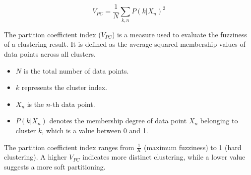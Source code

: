 \documentclass[12pt,letterpaper]{article}
\begin{document}
\begin{itemize}
    \[
    V_{PC} = \frac{1}{N} \sum_{k,n} P(k|X_n)^2
    \]

    \noindent The partition coefficient index (\(V_{PC}\)) is a measure used to evaluate the fuzziness of a clustering result. It is defined as the average squared membership values of data points across all clusters. 

    \begin{itemize}
        \item \( N \) is the total number of data points.
        \item \( k \) represents the cluster index.
        \item \( X_n \) is the \( n \)-th data point.
        \item \( P(k|X_n) \) denotes the membership degree of data point \( X_n \) belonging to cluster \( k \), which is a value between 0 and 1.
    \end{itemize}

    \noindent The partition coefficient index ranges from \( \frac{1}{K} \) (maximum fuzziness) to 1 (hard clustering). A higher \(V_{PC}\) indicates more distinct clustering, while a lower value suggests a more soft partitioning.

    \end{itemize}
\end{document}

